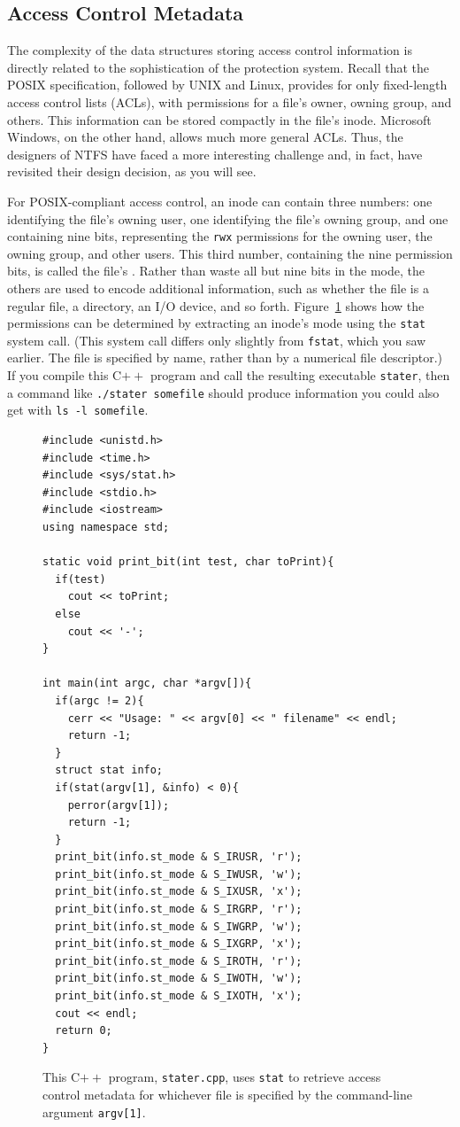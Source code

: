 \subsection{Access Control Metadata}\label{access-control-metadata-section}

The complexity of the data structures storing access control
information is directly related to the sophistication of the
protection system.  Recall that the POSIX specification, followed by
UNIX and Linux, provides for only fixed-length access control lists
(ACLs), with permissions for a file's owner, owning group, and
others.  This information can be stored compactly in the file's
inode.  Microsoft Windows, on the other hand, allows much more general
ACLs.  Thus, the designers of NTFS have faced a more interesting
challenge and, in fact, have revisited their design decision, as you
will see.

For POSIX-compliant access control, an inode can contain three
numbers: one identifying the file's owning user, one identifying the
file's owning group, and one containing nine bits, representing the
\verb|rwx| permissions for the owning user, the owning group, and other users.  This third
number, containing the nine permission bits, is called the file's
.  Rather than waste all but nine bits in the mode, the
others are used to encode additional information, such as whether the
file is a regular file, a directory, an I/O device, and so forth.
Figure~\ref{stater-source} shows how the permissions can be determined
by extracting an inode's mode using the {\tt stat} system call.  (This
system call differs only slightly from {\tt fstat}, which you saw
earlier.  The file is specified by name, rather than by a numerical
file descriptor.)  If you compile this C$++$ program and call the
resulting executable {\tt stater}, then a command like
\verb|./stater somefile| should produce information you could also get
with \verb|ls -l somefile|.
\begin{figure}
\begin{verbatim}
#include <unistd.h>
#include <time.h>
#include <sys/stat.h>
#include <stdio.h>
#include <iostream>
using namespace std;

static void print_bit(int test, char toPrint){
  if(test)
    cout << toPrint;
  else
    cout << '-';
}

int main(int argc, char *argv[]){
  if(argc != 2){
    cerr << "Usage: " << argv[0] << " filename" << endl;
    return -1;
  }
  struct stat info;
  if(stat(argv[1], &info) < 0){
    perror(argv[1]);
    return -1;
  }
  print_bit(info.st_mode & S_IRUSR, 'r');
  print_bit(info.st_mode & S_IWUSR, 'w');
  print_bit(info.st_mode & S_IXUSR, 'x');
  print_bit(info.st_mode & S_IRGRP, 'r');
  print_bit(info.st_mode & S_IWGRP, 'w');
  print_bit(info.st_mode & S_IXGRP, 'x');
  print_bit(info.st_mode & S_IROTH, 'r');
  print_bit(info.st_mode & S_IWOTH, 'w');
  print_bit(info.st_mode & S_IXOTH, 'x');
  cout << endl;
  return 0;
}
\end{verbatim}
\caption{This C$++$ program, {\tt stater.cpp}, uses {\tt stat} to
  retrieve access control metadata for whichever file is specified by
  the command-line argument {\tt argv[1]}.}
\label{stater-source}
\end{figure}

